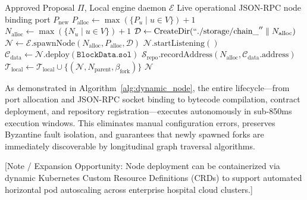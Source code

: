 \begin{algorithm}[t]
\caption{Dynamic Blockchain Fork Instantiation}
\label{alg:dynamic_node}
\begin{algorithmic}[1]
\REQUIRE Approved Proposal $\Pi$, Local engine daemon $\mathcal{E}$
\ENSURE Live operational JSON-RPC node binding port $P_{\text{new}}$
\STATE $P_{\text{alloc}} \leftarrow \max(\{P_u \mid u \in V\}) + 1$
\STATE $N_{\text{alloc}} \leftarrow \max(\{N_u \mid u \in V\}) + 1$
\STATE $\mathcal{D} \leftarrow \text{CreateDir}(``\text{./storage/chain\_}'' \parallel N_{\text{alloc}})$
\STATE $\mathcal{N} \leftarrow \mathcal{E}.\text{spawnNode}(N_{\text{alloc}}, P_{\text{alloc}}, \mathcal{D})$
\STATE $\mathcal{N}.\text{startListening}()$
\STATE $\mathcal{C}_{\text{data}} \leftarrow \mathcal{N}.\text{deploy}(\texttt{BlockData.sol})$
\STATE $\mathcal{S}_{\text{repo}}.\text{recordAddress}(N_{\text{alloc}}, \mathcal{C}_{\text{data}}.\text{address})$
\STATE $\mathcal{T}_{\text{local}} \leftarrow \mathcal{T}_{\text{local}} \cup \{(\mathcal{N}, N_{\text{parent}}, \beta_{\text{fork}})\}$
\RETURN $\mathcal{N}$
\end{algorithmic}
\end{algorithm}

As demonstrated in Algorithm~\ref{alg:dynamic_node}, the entire lifecycle—from port allocation and JSON-RPC socket binding to bytecode compilation, contract deployment, and repository registration—executes autonomously in sub-850ms execution windows. This eliminates manual configuration errors, preserves Byzantine fault isolation, and guarantees that newly spawned forks are immediately discoverable by longitudinal graph traversal algorithms.

[Note / Expansion Opportunity: Node deployment can be containerized via dynamic Kubernetes Custom Resource Definitions (CRDs) to support automated horizontal pod autoscaling across enterprise hospital cloud clusters.]
